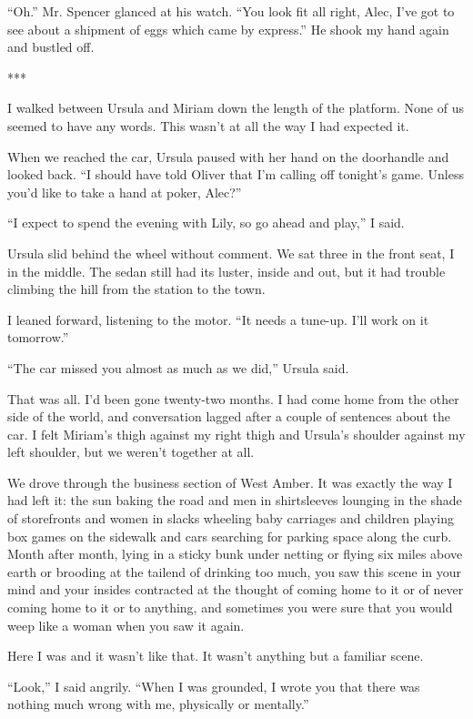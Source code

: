 \documentclass{novel}
\begin{document}
“Oh.” Mr. Spencer glanced at his watch. “You look fit all right, Alec, I’ve got to see about a shipment of eggs which came by express.” He shook my hand again and bustled off.

***

I walked between Ursula and Miriam down the length of the platform. None of us seemed to have any words. This wasn’t at all the way I had expected it.

When we reached the car, Ursula paused with her hand on the doorhandle and looked back. “I should have told Oliver that I’m calling off tonight’s game. Unless you’d like to take a hand at poker, Alec?”

“I expect to spend the evening with Lily, so go ahead and play,” I said.

Ursula slid behind the wheel without comment. We sat three in the front seat, I in the middle. The sedan still had its luster, inside and out, but it had trouble climbing the hill from the station to the town.

I leaned forward, listening to the motor. “It needs a tune-up. I’ll work on it tomorrow.”

“The car missed you almost as much as we did,” Ursula said.

That was all. I’d been gone twenty-two months. I had come home from the other side of the world, and conversation lagged after a couple of sentences about the car. I felt Miriam’s thigh against my right thigh and Ursula’s shoulder against my left shoulder, but we weren’t together at all.

We drove through the business section of West Amber. It was exactly the way I had left it: the sun baking the road and men in shirtsleeves lounging in the shade of storefronts and women in slacks wheeling baby carriages and children playing box games on the sidewalk and cars searching for parking space along the curb. Month after month, lying in a sticky bunk under netting or flying six miles above earth or brooding at the tailend of drinking too much, you saw this scene in your mind and your insides contracted at the thought of coming home to it or of never coming home to it or to anything, and sometimes you were sure that you would weep like a woman when you saw it again.

Here I was and it wasn’t like that. It wasn’t anything but a familiar scene.

“Look,” I said angrily. “When I was grounded, I wrote you that there was nothing much wrong with me, physically or mentally.”
\end{document}
